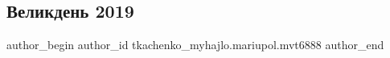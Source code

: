  
 
 
 
 
 
\subsection{Великдень 2019}
\label{sec:29_04_2019.fb.tkachenko_myhajlo.mariupol.mvt6888.1.velykden_2019}
 
\ifcmt
 author_begin
   author_id tkachenko_myhajlo.mariupol.mvt6888
 author_end
\fi

